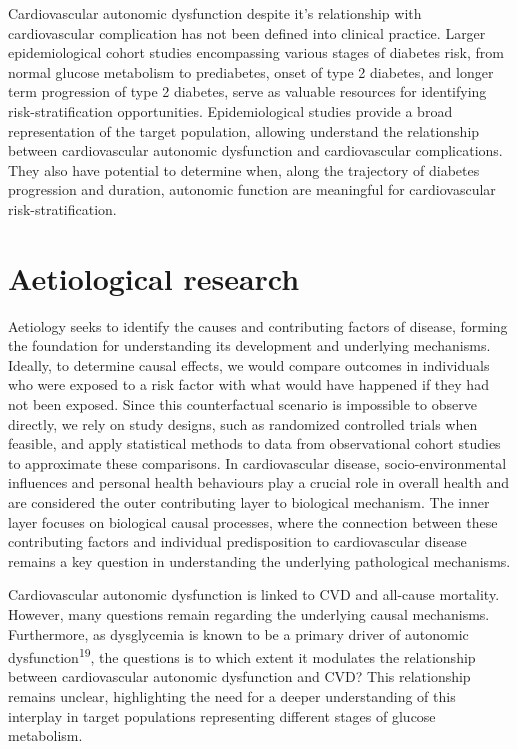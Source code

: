 \documentclass[
  a4paper,
  headsepline=true,
  open=any]{scrbook}
\begin{document}
Cardiovascular autonomic dysfunction despite it's relationship with
cardiovascular complication has not been defined into clinical practice.
Larger epidemiological cohort studies encompassing various stages of
diabetes risk, from normal glucose metabolism to prediabetes, onset of
type 2 diabetes, and longer term progression of type 2 diabetes, serve
as valuable resources for identifying risk-stratification opportunities.
Epidemiological studies provide a broad representation of the target
population, allowing understand the relationship between cardiovascular
autonomic dysfunction and cardiovascular complications. They also have
potential to determine when, along the trajectory of diabetes
progression and duration, autonomic function are meaningful for
cardiovascular risk-stratification.

\hypertarget{aetiological-research}{%
\section{Aetiological research}\label{aetiological-research}}

Aetiology seeks to identify the causes and contributing factors of
disease, forming the foundation for understanding its development and
underlying mechanisms. Ideally, to determine causal effects, we would
compare outcomes in individuals who were exposed to a risk factor with
what would have happened if they had not been exposed. Since this
counterfactual scenario is impossible to observe directly, we rely on
study designs, such as randomized controlled trials when feasible, and
apply statistical methods to data from observational cohort studies to
approximate these comparisons. In cardiovascular disease,
socio-environmental influences and personal health behaviours play a
crucial role in overall health and are considered the outer contributing
layer to biological mechanism. The inner layer focuses on biological
causal processes, where the connection between these contributing
factors and individual predisposition to cardiovascular disease remains
a key question in understanding the underlying pathological mechanisms.

Cardiovascular autonomic dysfunction is linked to CVD and all-cause
mortality. However, many questions remain regarding the underlying
causal mechanisms. Furthermore, as dysglycemia is known to be a primary
driver of autonomic dysfunction\textsuperscript{19}, the questions is to
which extent it modulates the relationship between cardiovascular
autonomic dysfunction and CVD? This relationship remains unclear,
highlighting the need for a deeper understanding of this interplay in
target populations representing different stages of glucose metabolism.
\end{document}
